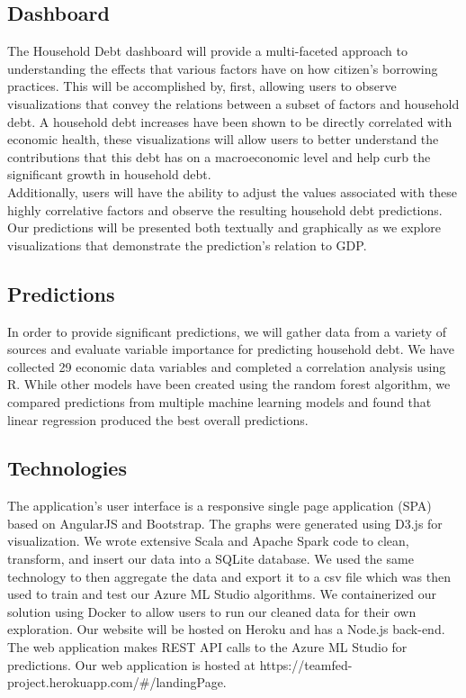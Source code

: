 \documentclass[sigconf,nonacm,11pt]{acmart}
\begin{document}
\subsection{Dashboard}
The Household Debt dashboard will provide a multi-faceted approach to understanding the effects that various factors have on how citizen's borrowing practices.  This will be accomplished by, first, allowing users to observe visualizations that convey the relations between a subset of factors and household debt.  A household debt increases have been shown to be directly correlated with economic health\cite{Mian2015}, these visualizations will allow users to better understand the contributions that this debt has on a macroeconomic level and help curb the significant growth in household debt\cite{Alter2018}.\\
Additionally, users will have the ability to adjust the values associated with these highly correlative factors and observe the resulting household debt predictions.  Our predictions will be presented both textually and graphically as we explore visualizations that demonstrate the prediction's relation to GDP.\vspace{-0.5em}

\subsection{Predictions}

In order to provide significant predictions, we will gather data from a variety of sources and evaluate variable importance for predicting household debt. We have collected 29 economic data variables and completed a correlation analysis using R.  While other models have been created using the random forest algorithm\cite{Nyman2018}, we compared predictions from multiple machine learning models and found that linear regression produced the best overall predictions.\vspace{-0.5em}

\subsection{Technologies}

The application's user interface is a responsive single page application (SPA) based on AngularJS and Bootstrap. The graphs were generated using D3.js for visualization. We wrote extensive Scala and Apache Spark code to clean, transform, and insert our data into a SQLite database. We used the same technology to then aggregate the data and export it to a csv file which was then used to train and test our Azure ML Studio algorithms. We containerized our solution using Docker to allow users to run our cleaned data for their own exploration. Our website will be hosted on Heroku and has a Node.js back-end. The web application makes REST API calls to the Azure ML Studio for predictions. Our web application is hosted at https://teamfed-project.herokuapp.com/#/landingPage.  
\end{document}

